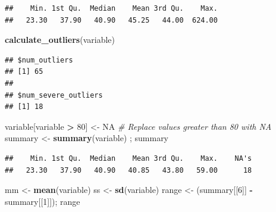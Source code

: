\documentclass[
]{article}
\newenvironment{Shaded}{\begin{snugshade}}{\end{snugshade}}
\newcommand{\CommentTok}[1]{\textcolor[rgb]{0.56,0.35,0.01}{\textit{#1}}}
\newcommand{\ConstantTok}[1]{\textcolor[rgb]{0.56,0.35,0.01}{#1}}
\newcommand{\DecValTok}[1]{\textcolor[rgb]{0.00,0.00,0.81}{#1}}
\newcommand{\FunctionTok}[1]{\textcolor[rgb]{0.13,0.29,0.53}{\textbf{#1}}}
\newcommand{\NormalTok}[1]{#1}
\newcommand{\OtherTok}[1]{\textcolor[rgb]{0.56,0.35,0.01}{#1}}
\newcommand{\SpecialCharTok}[1]{\textcolor[rgb]{0.81,0.36,0.00}{\textbf{#1}}}
\begin{document}
\begin{Shaded}
\end{Shaded}

\begin{verbatim}
##    Min. 1st Qu.  Median    Mean 3rd Qu.    Max. 
##   23.30   37.90   40.90   45.25   44.00  624.00
\end{verbatim}

\begin{Shaded}
\begin{Highlighting}[]
\FunctionTok{calculate\_outliers}\NormalTok{(variable)}
\end{Highlighting}
\end{Shaded}

\begin{verbatim}
## $num_outliers
## [1] 65
## 
## $num_severe_outliers
## [1] 18
\end{verbatim}

\begin{Shaded}
\begin{Highlighting}[]
\NormalTok{variable[variable }\SpecialCharTok{\textgreater{}} \DecValTok{80}\NormalTok{] }\OtherTok{\textless{}{-}} \ConstantTok{NA}  \CommentTok{\# Replace values greater than 80 with NA}
\NormalTok{summary }\OtherTok{\textless{}{-}} \FunctionTok{summary}\NormalTok{(variable) ; summary}
\end{Highlighting}
\end{Shaded}

\begin{verbatim}
##    Min. 1st Qu.  Median    Mean 3rd Qu.    Max.    NA's 
##   23.30   37.90   40.90   40.85   43.80   59.00      18
\end{verbatim}

\begin{Shaded}
\begin{Highlighting}[]
\NormalTok{mm }\OtherTok{\textless{}{-}} \FunctionTok{mean}\NormalTok{(variable)}
\NormalTok{ss }\OtherTok{\textless{}{-}} \FunctionTok{sd}\NormalTok{(variable)}
\NormalTok{range }\OtherTok{\textless{}{-}}\NormalTok{ (summary[[}\DecValTok{6}\NormalTok{]] }\SpecialCharTok{{-}}\NormalTok{ summary[[}\DecValTok{1}\NormalTok{]]); range}
\end{Highlighting}
\end{Shaded}
\end{document}
